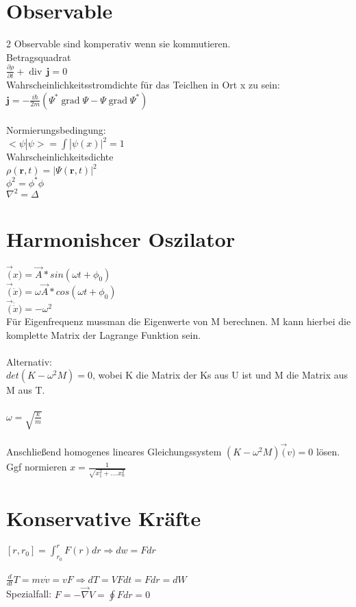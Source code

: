 \documentclass[10pt,a4paper]{article}
\begin{document}
\section{Observable}
2 Observable sind komperativ wenn sie kommutieren.\\
%
Betragsquadrat\\
$ \frac{\partial \rho}{\partial t} + \operatorname{div} \, \mathbf{j} = 0$\\
%
  Wahrscheinlichkeitsstromdichte für das Teiclhen in Ort x zu sein:\\
$ \mathbf j = -\frac{i \hbar}{2m}(\Psi^*\operatorname{grad}\Psi - \Psi\operatorname{grad}\Psi^*)$\\
%
\\
Normierungsbedingung:\\
$<\psi|\psi>=\int |\psi(x)|^2=1$\\
 Wahrscheinlichkeitsdichte\\
$\rho(\mathbf r,t)=|\Psi(\mathbf r,t)|^2$\\
%
$\phi^2=\phi^*\phi$\\
$\nabla^2=\Delta$

\section{Harmonishcer Oszilator}
$\vec(x)=\vec{A}*sin(\omega t + \phi_0)$\\
$\vec(\dot{x})=\omega\vec{A}*cos(\omega t + \phi_0)$\\
$\vec(\dot{\dot{x}})=-\omega^2$\\
%
Für Eigenfrequenz mussman die Eigenwerte von M berechnen. M kann hierbei die komplette Matrix der Lagrange Funktion sein.\\
%
\\
Alternativ:\\
$det(K-\omega^2M)=0$, wobei K die Matrix der Ks aus U ist und M die Matrix aus M aus T.\\
%
\\
$\omega=\sqrt{\frac{k}{m}}$\\
%
\\
Anschließend homogenes lineares Gleichungssystem $(K-\omega^2M)\vec(v)=0$ lösen. Ggf normieren $x=\frac{1}{\sqrt{x^2_1+....x^2_n}}$\\
%
\section{Konservative Kräfte}
$[r,r_0]=\int_{r_0}^r F(r) dr \Rightarrow dw = Fdr$\\
%
\\
$\frac{d}{dt}T=mv\dot{v}=vF \Rightarrow dT = VFdt = Fdr = dW$\\
Spezialfall: $F=-\vec{\nabla}V=\oint Fdr=0$\\
%
\end{document}
